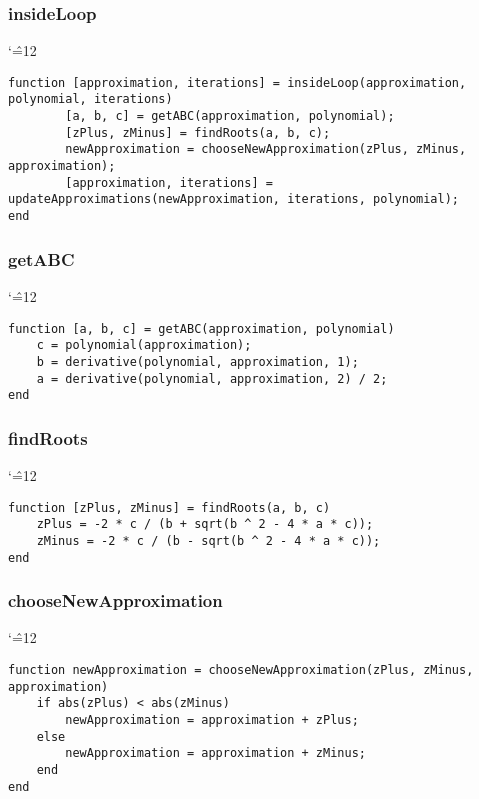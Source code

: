 \documentclass[12pt]{report}
\newenvironment{simplechar}{%
   \catcode`\^=12
}{}
\begin{document}
\subsubsection{insideLoop}
\begin{simplechar}
\begin{lstlisting}
function [approximation, iterations] = insideLoop(approximation, polynomial, iterations)
        [a, b, c] = getABC(approximation, polynomial);
        [zPlus, zMinus] = findRoots(a, b, c);
        newApproximation = chooseNewApproximation(zPlus, zMinus, approximation);
        [approximation, iterations] = updateApproximations(newApproximation, iterations, polynomial);
end
\end{lstlisting}
\end{simplechar}

\subsubsection{getABC}
\begin{simplechar}
\begin{lstlisting}
function [a, b, c] = getABC(approximation, polynomial)
    c = polynomial(approximation);
    b = derivative(polynomial, approximation, 1);
    a = derivative(polynomial, approximation, 2) / 2;
end
\end{lstlisting}
\end{simplechar}

\subsubsection{findRoots}
\begin{simplechar}
\begin{lstlisting}
function [zPlus, zMinus] = findRoots(a, b, c)
    zPlus = -2 * c / (b + sqrt(b ^ 2 - 4 * a * c));
    zMinus = -2 * c / (b - sqrt(b ^ 2 - 4 * a * c));
end
\end{lstlisting}
\end{simplechar}

\subsubsection{chooseNewApproximation}
\begin{simplechar}
\begin{lstlisting}
function newApproximation = chooseNewApproximation(zPlus, zMinus, approximation)
    if abs(zPlus) < abs(zMinus)
        newApproximation = approximation + zPlus;
    else
        newApproximation = approximation + zMinus;
    end
end
\end{lstlisting}
\end{simplechar}
\end{document}
